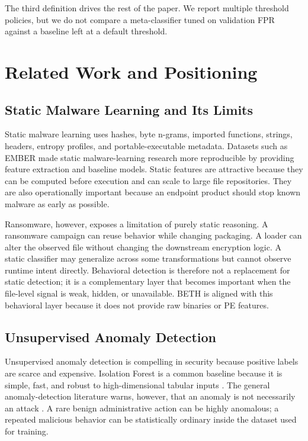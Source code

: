 \documentclass[10pt,journal,compsoc]{IEEEtran}
\begin{document}
The third definition drives the rest of the paper. We report multiple threshold policies, but we do not compare a meta-classifier tuned on validation FPR against a baseline left at a default threshold.

\section{Related Work and Positioning}
\label{sec:related}

\subsection{Static Malware Learning and Its Limits}

Static malware learning uses hashes, byte n-grams, imported functions, strings, headers, entropy profiles, and portable-executable metadata. Datasets such as EMBER \cite{anderson2018} made static malware-learning research more reproducible by providing feature extraction and baseline models. Static features are attractive because they can be computed before execution and can scale to large file repositories. They are also operationally important because an endpoint product should stop known malware as early as possible.

Ransomware, however, exposes a limitation of purely static reasoning. A ransomware campaign can reuse behavior while changing packaging. A loader can alter the observed file without changing the downstream encryption logic. A static classifier may generalize across some transformations but cannot observe runtime intent directly. Behavioral detection is therefore not a replacement for static detection; it is a complementary layer that becomes important when the file-level signal is weak, hidden, or unavailable. BETH is aligned with this behavioral layer because it does not provide raw binaries or PE features.

\subsection{Unsupervised Anomaly Detection}

Unsupervised anomaly detection is compelling in security because positive labels are scarce and expensive. Isolation Forest is a common baseline because it is simple, fast, and robust to high-dimensional tabular inputs \cite{liu2008}. The general anomaly-detection literature warns, however, that an anomaly is not necessarily an attack \cite{chandola2009}. A rare benign administrative action can be highly anomalous; a repeated malicious behavior can be statistically ordinary inside the dataset used for training.
\end{document}
